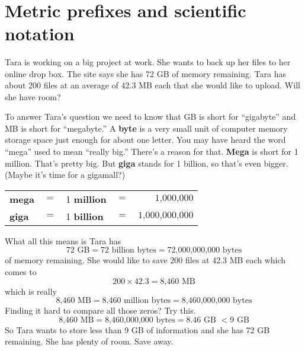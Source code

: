 ~\vspace{.1in}

\section{Metric prefixes and scientific notation} 

Tara is working on a big project at work.  She wants to back up her files to her online drop box. The site says she has 72 GB of memory remaining.  Tara has about 200 files at an average of 42.3 MB each that she would like to upload.  Will she have room?

To answer Tara's question we need to know that GB is short for ``gigabyte'' and MB is short for ``megabyte.''  A \textbf{byte} is a very small unit of computer memory storage space just enough for about one letter.  You may have heard the word ``mega'' used to mean ``really big.''  There's a reason for that.  \textbf{Mega} is short for 1 million.  That's pretty big.  But \textbf{giga} stands for 1 billion, so that's even bigger.  (Maybe it's time for a gigamall?) 
\begin{center}
\begin{tabular} {lclcr} 
\textbf{mega} &$=$&1 \textbf{ million} &$=$&$ \text{1,000,000}$\\
\textbf{giga} &$=$& 1 \textbf{ billion} &$=$& $\text{1,000,000,000}$\\ 
\end{tabular}
\end{center}

What all this means is Tara has
$$72\text{ GB} = 72 \text{ billion bytes} = \text{72,000,000,000 bytes}$$
of memory remaining.
She would like to save 200 files at 42.3 MB each which comes to
$$200 \times 42.3 = \text{8,460 MB}$$
which is really $$ \text{8,460 MB} = \text{8,460 million bytes} = \text{8,460,000,000} \text{ bytes}$$
Finding it hard to compare all those zeros?  Try this.
$$ \text{8,460 MB} = \text{8,460,000,000 bytes} = 8.46 \text{ GB } < 9 \text{ GB}$$
So Tara wants to store less than 9 GB of information and she has 72 GB remaining.  She has plenty of room.  Save away.

